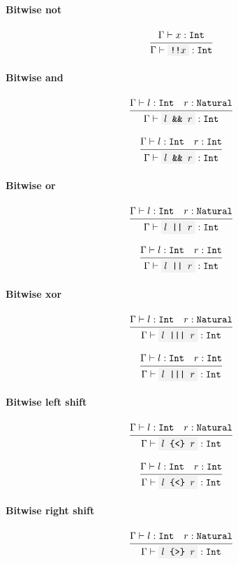 \documentclass[11pt]{report}
\newcommand{\infrule}[3][gathered]{\frac{\begin{#1}#2\end{#1}}{\begin{gathered}#3\end{gathered}}}
\newcommand{\then}{\vdash}
\newcommand{\code}[1]{\texttt{\colorbox{gray!10}{#1}}}
\newcommand{\Int}{\texttt{Int}}
\newcommand{\Natural}{\texttt{Natural}}
\newcommand{\Env}{\Gamma}
\theoremstyle{definition}
\begin{document}
\paragraph{Bitwise not}

\[
	\infrule{
		\Env\then x:\Int
	}{
		\Env\then \code{!!$x$} : \Int
	}
\]

\paragraph{Bitwise and}

\[
	\infrule{
		\Env\then l:\Int \quad r:\Natural
	}{
		\Env\then \code{$l$ \&\& $r$} : \Int
	}
\]

\[
	\infrule{
		\Env\then l:\Int \quad r:\Int
	}{
		\Env\then \code{$l$ \&\& $r$} : \Int
	}
\]

\paragraph{Bitwise or}

\[
	\infrule{
		\Env\then l:\Int \quad r:\Natural
	}{
		\Env\then \code{$l$ || $r$} : \Int
	}
\]

\[
	\infrule{
		\Env\then l:\Int \quad r:\Int
	}{
		\Env\then \code{$l$ || $r$} : \Int
	}
\]

\paragraph{Bitwise xor}

\[
	\infrule{
		\Env\then l:\Int \quad r:\Natural
	}{
		\Env\then \code{$l$ ||| $r$} : \Int
	}
\]

\[
	\infrule{
		\Env\then l:\Int \quad r:\Int
	}{
		\Env\then \code{$l$ ||| $r$} : \Int
	}
\]

\paragraph{Bitwise left shift}

\[
	\infrule{
		\Env\then l:\Int \quad r:\Natural
	}{
		\Env\then \code{$l$ \{<\} $r$} : \Int
	}
\]

\[
	\infrule{
		\Env\then l:\Int \quad r:\Int
	}{
		\Env\then \code{$l$ \{<\} $r$} : \Int
	}
\]

\paragraph{Bitwise right shift}

\[
	\infrule{
		\Env\then l:\Int \quad r:\Natural
	}{
		\Env\then \code{$l$ \{>\} $r$} : \Int
	}
\]
\end{document}
